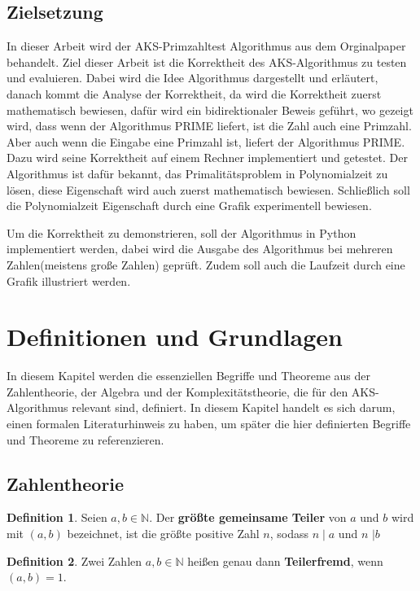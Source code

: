 \documentclass[12pt,oneside]{article}
\theoremstyle{remark}
\theoremstyle{definition}
\newtheorem{definition}{Definition}[section]
\begin{document}
\subsection{Zielsetzung}
In dieser Arbeit wird der AKS-Primzahltest Algorithmus aus dem Orginalpaper behandelt. Ziel dieser Arbeit ist die Korrektheit des AKS-Algorithmus zu testen und evaluieren. Dabei wird die Idee Algorithmus dargestellt und erläutert, danach kommt die Analyse der Korrektheit, da wird die Korrektheit zuerst mathematisch bewiesen, dafür wird ein bidirektionaler Beweis geführt, wo gezeigt wird, dass wenn der Algorithmus PRIME liefert, ist die Zahl auch eine Primzahl. Aber auch wenn die Eingabe eine Primzahl ist, liefert der Algorithmus PRIME. Dazu wird seine Korrektheit auf einem Rechner implementiert und getestet. Der Algorithmus ist dafür bekannt, das Primalitätsproblem in Polynomialzeit zu lösen, diese Eigenschaft wird auch zuerst mathematisch bewiesen. Schließlich soll die Polynomialzeit Eigenschaft durch eine Grafik experimentell bewiesen.  

Um die Korrektheit zu demonstrieren, soll der Algorithmus in Python implementiert werden, dabei wird die Ausgabe des Algorithmus bei mehreren Zahlen(meistens große Zahlen) geprüft. Zudem soll auch die Laufzeit durch eine Grafik illustriert werden.  


\section{Definitionen und Grundlagen}
In diesem Kapitel werden die essenziellen Begriffe und Theoreme aus der Zahlentheorie, der Algebra und der Komplexitätstheorie, die für den AKS-Algorithmus relevant sind, definiert. In diesem Kapitel handelt es sich darum, einen formalen Literaturhinweis zu haben, um später die hier definierten Begriffe und Theoreme zu referenzieren.
\subsection{Zahlentheorie}
\theoremstyle{definition}
\begin{definition}\label{Df_1}
Seien $a,b \in \mathbb{N}$. Der \textbf{größte gemeinsame Teiler} von $a$ und $b$ wird mit $(a,b)$ bezeichnet, ist die größte positive Zahl $n$, sodass $n \mid a$ und $n$ $ \mid b$
\end{definition}

\smallskip 

\begin{definition}\label{Df_2}
Zwei Zahlen $a,b \in \mathbb{N}$ heißen genau dann \textbf{Teilerfremd}, wenn $(a,b) = 1$.
\end{definition}
\end{document}
